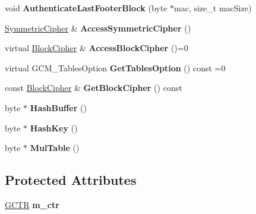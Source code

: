 \begin{DoxyCompactItemize}
\item 
\hypertarget{class_g_c_m___base_a4903084cdee26d3ec90a37c331312689}{
void {\bfseries AuthenticateLastFooterBlock} (byte $\ast$mac, size\_\-t macSize)}
\label{class_g_c_m___base_a4903084cdee26d3ec90a37c331312689}

\item 
\hypertarget{class_g_c_m___base_a96625c0758ba8cbbf97abc99a876ef58}{
\hyperlink{class_symmetric_cipher}{SymmetricCipher} \& {\bfseries AccessSymmetricCipher} ()}
\label{class_g_c_m___base_a96625c0758ba8cbbf97abc99a876ef58}

\item 
\hypertarget{class_g_c_m___base_aa9e4fe7216966ccb7f20bdb37789dca5}{
virtual \hyperlink{class_block_cipher}{BlockCipher} \& {\bfseries AccessBlockCipher} ()=0}
\label{class_g_c_m___base_aa9e4fe7216966ccb7f20bdb37789dca5}

\item 
\hypertarget{class_g_c_m___base_aa15e3d1549b3530ff4d7122c90d3f64b}{
virtual GCM\_\-TablesOption {\bfseries GetTablesOption} () const =0}
\label{class_g_c_m___base_aa15e3d1549b3530ff4d7122c90d3f64b}

\item 
\hypertarget{class_g_c_m___base_a3f14fb6a65206cdbd60ca792e864d38c}{
const \hyperlink{class_block_cipher}{BlockCipher} \& {\bfseries GetBlockCipher} () const }
\label{class_g_c_m___base_a3f14fb6a65206cdbd60ca792e864d38c}

\item 
\hypertarget{class_g_c_m___base_aecf32d0f937449ce7b7ebaad5e31ca0c}{
byte $\ast$ {\bfseries HashBuffer} ()}
\label{class_g_c_m___base_aecf32d0f937449ce7b7ebaad5e31ca0c}

\item 
\hypertarget{class_g_c_m___base_aa4f42f8afb10aab08e8bfd5eeeb1ac91}{
byte $\ast$ {\bfseries HashKey} ()}
\label{class_g_c_m___base_aa4f42f8afb10aab08e8bfd5eeeb1ac91}

\item 
\hypertarget{class_g_c_m___base_aeb142a90a1f0701b6af76783e6a19ed4}{
byte $\ast$ {\bfseries MulTable} ()}
\label{class_g_c_m___base_aeb142a90a1f0701b6af76783e6a19ed4}

\end{DoxyCompactItemize}
\subsection*{Protected Attributes}
\begin{DoxyCompactItemize}
\item 
\hypertarget{class_g_c_m___base_a993cba8e4664f53667a0b7e69e14450a}{
\hyperlink{class_g_c_m___base_1_1_g_c_t_r}{GCTR} {\bfseries m\_\-ctr}}
\label{class_g_c_m___base_a993cba8e4664f53667a0b7e69e14450a}

\end{DoxyCompactItemize}
